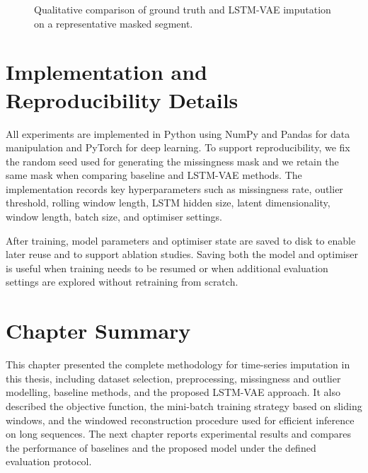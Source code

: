\begin{figure}[ht]
	\centering
	\caption{Qualitative comparison of ground truth and LSTM-VAE imputation on a representative masked segment.}
	\label{fig:qualitative-imputation}
\end{figure}

\section{Implementation and Reproducibility Details}
All experiments are implemented in Python using NumPy and Pandas for data manipulation and PyTorch for deep learning. To support reproducibility, we fix the random seed used for generating the missingness mask and we retain the same mask when comparing baseline and LSTM-VAE methods. The implementation records key hyperparameters such as missingness rate, outlier threshold, rolling window length, LSTM hidden size, latent dimensionality, window length, batch size, and optimiser settings.

After training, model parameters and optimiser state are saved to disk to enable later reuse and to support ablation studies. Saving both the model and optimiser is useful when training needs to be resumed or when additional evaluation settings are explored without retraining from scratch.

\section{Chapter Summary}
This chapter presented the complete methodology for time-series imputation in this thesis, including dataset selection, preprocessing, missingness and outlier modelling, baseline methods, and the proposed LSTM-VAE approach. It also described the objective function, the mini-batch training strategy based on sliding windows, and the windowed reconstruction procedure used for efficient inference on long sequences. The next chapter reports experimental results and compares the performance of baselines and the proposed model under the defined evaluation protocol.


